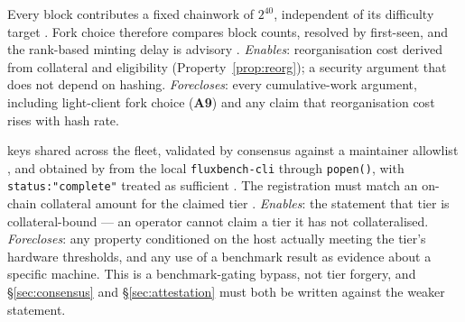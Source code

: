 \begin{assumption}
\label{asm:a3-forkchoice}
\shipped Every \PoN{} block contributes a fixed chainwork of $2^{40}$, independent of its difficulty
target . Fork choice therefore compares block counts, resolved
by first-seen, and the rank-based minting delay is advisory
.
\emph{Enables}: reorganisation cost derived from collateral and eligibility
(Property~\ref{prop:reorg}); a security argument that does not depend on hashing.
\emph{Forecloses}: every cumulative-work argument, including light-client fork choice
(\textbf{A9}) and any claim that reorganisation cost rises with hash rate.
\end{assumption}

\begin{assumption}
\label{asm:a4-benchmark}
keys shared across the fleet, validated by consensus against a maintainer allowlist
, and obtained by \fluxd{} from the local
\texttt{fluxbench-cli} through \texttt{popen()}, with \texttt{status:\allowbreak{}"complete"} treated as
sufficient . The registration must match an
on-chain collateral amount for the claimed tier .
\emph{Enables}: the statement that tier is collateral-bound --- an operator cannot claim a tier it
has not collateralised. \emph{Forecloses}: any property conditioned on the host actually meeting the
tier's hardware thresholds, and any use of a benchmark result as evidence about a specific machine.
This is a benchmark-gating bypass, not tier forgery, and \S\ref{sec:consensus} and
\S\ref{sec:attestation} must both be written against the weaker statement.
\end{assumption}

